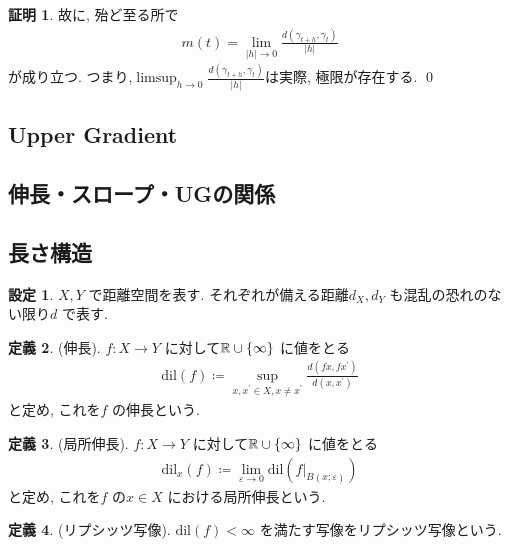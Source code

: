 \documentclass[10pt, fleqn, label-section=none]{bxjsarticle}
\theoremstyle{definition}
\newtheorem{dfn}{定義}[section]
\newtheorem{setting}[dfn]{設定}
\newtheorem*{pf*}{証明}
\newcommand{\veps}{\varepsilon}
\newcommand{\cbra}[1]{\mleft\{#1\mright\}}
\newcommand{\abs}[1]{\left|#1\right|}
\renewcommand{\;}{\, ; \,}
\begin{document}
\begin{pf*}
故に, 殆ど至る所で
\begin{align*} m(t) = \lim_{\abs h \rightarrow 0} \frac{d(\gamma_{t+h} , \gamma_t)}{\abs h} \end{align*}
が成り立つ. つまり,$\limsup_{h \rightarrow 0} \frac{d(\gamma_{t +h} , \gamma_t)}{\abs h}$は実際, 極限が存在する. 
\qed
\end{pf*}

\subsection{Upper Gradient}



\subsection{伸長・スロープ・UGの関係}


\subsection{長さ構造}

\begin{setting}
$X, Y$ で距離空間を表す. それぞれが備える距離$d_X, d_Y$ も混乱の恐れのない限り$d$ で表す. 

\end{setting}

\begin{dfn}(伸長). $f: X \rightarrow Y$ に対して$\mathbb R \cup \cbra{\infty}$ に値をとる
\begin{align*} \textrm{dil} (f) \coloneqq \sup_{x, x^\prime \in X, x \neq x^\prime } \frac{d(fx, fx^\prime )}{ d(x, x^\prime) } \end{align*} 
と定め, これを$f$ の伸長という. 

\end{dfn}

\begin{dfn}(局所伸長). $f: X \rightarrow Y$ に対して$\mathbb R \cup \cbra{\infty}$ に値をとる
\begin{align*} \textrm{dil}_x (f) \coloneqq \lim_{\veps \rightarrow 0} \textrm{dil}(f | _ {B(x; \veps)}) \end{align*} 
と定め, これを$f$ の$x \in X$ における局所伸長という. 

\end{dfn}

\begin{dfn}(リプシッツ写像). $\textrm{dil} (f) < \infty$ を満たす写像をリプシッツ写像という. 

\end{dfn}
\end{document}
